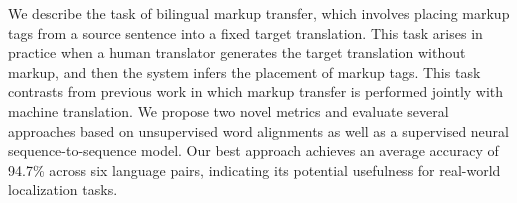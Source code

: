 We describe the task of bilingual markup transfer, which involves placing markup tags from a source sentence into a fixed target translation. This task arises in practice when a human translator generates the target translation without markup, and then the system infers the placement of markup tags. This task contrasts from previous work in which markup transfer is performed jointly with machine translation. We propose two novel metrics and evaluate several approaches based on unsupervised word alignments as well as a supervised neural sequence-to-sequence model. Our best approach achieves an average accuracy of 94.7\% across six language pairs, indicating its potential usefulness for real-world localization tasks.
